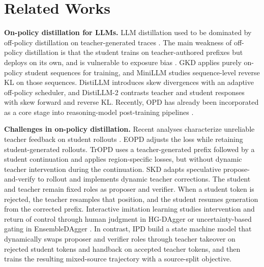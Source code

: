 \documentclass{article} %
\begin{document}
\section{Related Works}
\label{sec:related_works}

\noindent\textbf{On-policy distillation for LLMs.} LLM distillation used to be dominated by off-policy distillation on teacher-generated traces \citep{hinton2015distilling, kim2016sequence, guo2025deepseek}. The main weakness of off-policy distillation is that the student trains on teacher-authored prefixes but deploys on its own, and is vulnerable to exposure bias \citep{bengio2015scheduled, arora2022exposure}. 
GKD \citep{gkd} applies purely on-policy student sequences for training, and MiniLLM \citep{gu2024minillm} studies sequence-level reverse KL on those sequences. DistiLLM \citep{ko2024distillm} introduces skew divergences with an adaptive off-policy scheduler, and DistiLLM-2 \citep{ko2025distillm} contrasts teacher and student responses with skew forward and reverse KL.
Recently, OPD has already been incorporated as a core stage into reasoning-model post-training pipelines \citep{yang2025qwen3, lu2025onpolicydistillation, xiao2026mimo}.

\noindent\textbf{Challenges in on-policy distillation.}
Recent analyses characterize unreliable teacher feedback on student rollouts \citep{fu2026revisiting, armandpour2026unmasking, li2026rethinking}. EOPD \citep{jin2026entropyaware} adjusts the loss while retaining student-generated rollouts. TrOPD \citep{xing2026trust} uses a teacher-generated prefix followed by a student continuation and applies region-specific losses, but without dynamic teacher intervention during the continuation. SKD \citep{skd} adapts speculative propose-and-verify \citep{leviathan2023fast, chen2023accelerating} to rollout and implements dynamic teacher corrections. The student and teacher remain fixed roles as proposer and verifier. When a student token is rejected, the teacher resamples that position, and the student resumes generation from the corrected prefix.
Interactive imitation learning studies intervention and return of control through human judgment in HG-DAgger \citep{kelly2019hg} or uncertainty-based gating in EnsembleDAgger \citep{menda2019ensembledagger}. 
In contrast, IPD build a state machine model that dynamically swaps proposer and verifier roles through teacher takeover on rejected student tokens and handback on accepted teacher tokens, and then trains the resulting mixed-source trajectory with a source-split objective.
\end{document}
